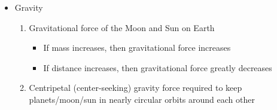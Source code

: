 \begin{itemize}
    \item Gravity
    \begin{enumerate}
        \item Gravitational force of the Moon and Sun on Earth
        \begin{itemize}
            \item If mass increases, then gravitational force increases
            \item If distance increases, then gravitational force greatly
                decreases
        \end{itemize}
        \item Centripetal (center-seeking) gravity force required to keep
            planets/moon/sun in nearly circular orbits around each other
    \end{enumerate}
\end{itemize}
